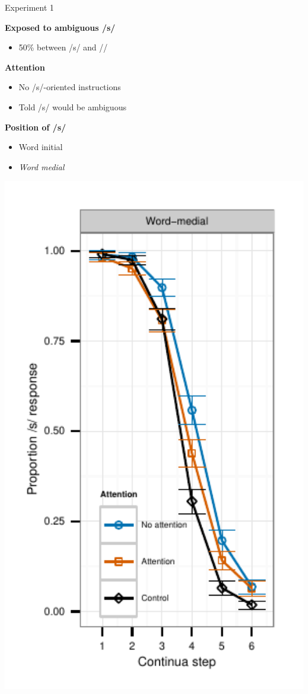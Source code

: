 \documentclass{beamer}
\begin{document}
\begin{frame}{Experiment 1}

\begin{minipage}{0.45\textwidth}
\textbf{Exposed to ambiguous /s/}
\begin{itemize}
\item 50\% between /s/ and /\textesh/
\end{itemize}

\textbf{Attention}
\begin{itemize}
\item No /s/-oriented instructions
\item Told /s/ would be ambiguous
\end{itemize}

\textbf{Position of /s/}
\begin{itemize}
\item Word initial
\item \emph{Word medial}
\end{itemize}
\end{minipage}
\hfill
\begin{minipage}{0.4\textwidth}
\includegraphics[width=1.0\textwidth]{graphs/exp1_categresults_present2-final}
\end{minipage}


\end{frame}
\end{document}
